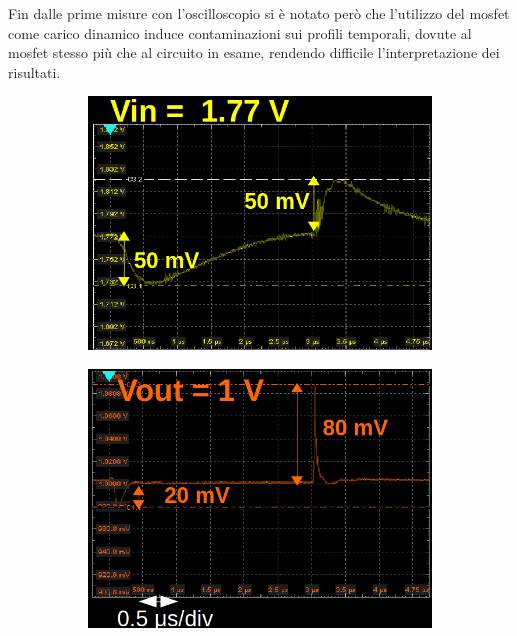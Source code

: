 Fin dalle prime misure con l'oscilloscopio si è notato per\`o che l'utilizzo del mosfet come carico dinamico induce contaminazioni sui profili temporali, dovute al mosfet stesso pi\`u che al circuito in esame, rendendo difficile l'interpretazione dei risultati.
\begin{figure}
\begin{subfigure}{.5\textwidth}
  \centering
  \includegraphics[width=.96\linewidth]{Immagini/zoomTransientTest1}
  \caption{ }
  \label{TransientTest:sfig1}
\end{subfigure}%
\begin{subfigure}{.5\textwidth}
  \centering
  \includegraphics[width=.95\linewidth]{Immagini/zoomTransientTest2}
  \caption{ }
  \label{TransientTest:sfig2}
\end{subfigure}

\end{figure}

